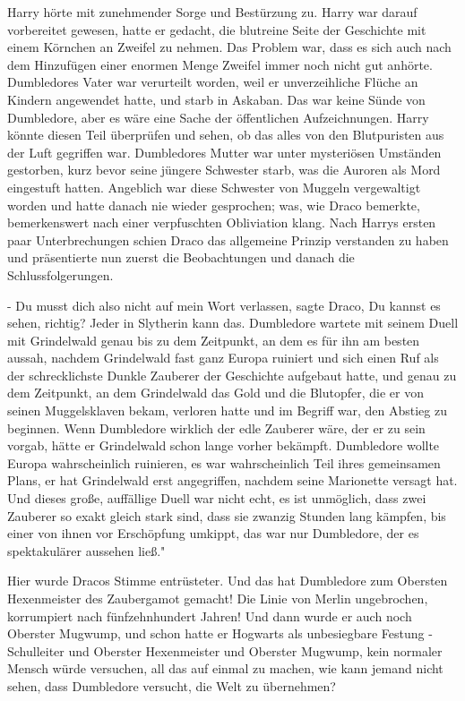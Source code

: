 Harry hörte mit zunehmender Sorge und Bestürzung zu. Harry war darauf
vorbereitet gewesen, hatte er gedacht, die blutreine Seite der Geschichte mit
einem Körnchen an Zweifel zu nehmen. Das Problem war, dass es sich auch nach dem
Hinzufügen einer enormen Menge Zweifel immer noch nicht gut anhörte. Dumbledores
Vater war verurteilt worden, weil er unverzeihliche Flüche an Kindern angewendet
hatte, und starb in Askaban. Das war keine Sünde von Dumbledore, aber es wäre
eine Sache der öffentlichen Aufzeichnungen. Harry könnte diesen Teil überprüfen
und sehen, ob das alles von den Blutpuristen aus der Luft gegriffen war.
Dumbledores Mutter war unter mysteriösen Umständen gestorben, kurz bevor seine
jüngere Schwester starb, was die Auroren als Mord eingestuft hatten. Angeblich
war diese Schwester von Muggeln vergewaltigt worden und hatte danach nie wieder
gesprochen; was, wie Draco bemerkte, bemerkenswert nach einer verpfuschten
Obliviation klang. Nach Harrys ersten paar Unterbrechungen schien Draco das
allgemeine Prinzip verstanden zu haben und präsentierte nun zuerst die
Beobachtungen und danach die Schlussfolgerungen.

\glqq{}- Du musst dich also nicht auf mein Wort verlassen\grqq{}, sagte Draco,
\glqq{}Du kannst es sehen, richtig? Jeder in Slytherin kann das. Dumbledore
wartete mit seinem Duell mit Grindelwald genau bis zu dem Zeitpunkt, an dem es
für ihn am besten aussah, nachdem Grindelwald fast ganz Europa ruiniert und sich
einen Ruf als der schrecklichste Dunkle Zauberer der Geschichte aufgebaut hatte,
und genau zu dem Zeitpunkt, an dem Grindelwald das Gold und die Blutopfer, die
er von seinen Muggelsklaven bekam, verloren hatte und im Begriff war, den
Abstieg zu beginnen. Wenn Dumbledore wirklich der edle Zauberer wäre, der er zu
sein vorgab, hätte er Grindelwald schon lange vorher bekämpft. Dumbledore wollte
Europa wahrscheinlich ruinieren, es war wahrscheinlich Teil ihres gemeinsamen
Plans, er hat Grindelwald erst angegriffen, nachdem seine Marionette versagt
hat. Und dieses große, auffällige Duell war nicht echt, es ist unmöglich, dass
zwei Zauberer so exakt gleich stark sind, dass sie zwanzig Stunden lang kämpfen,
bis einer von ihnen vor Erschöpfung umkippt, das war nur Dumbledore, der es
spektakulärer aussehen ließ."

Hier wurde Dracos Stimme entrüsteter. \glqq{}Und das hat Dumbledore zum Obersten
Hexenmeister des Zaubergamot gemacht! Die Linie von Merlin ungebrochen,
korrumpiert nach fünfzehnhundert Jahren! Und dann wurde er auch noch Oberster
Mugwump, und schon hatte er Hogwarts als unbesiegbare Festung - Schulleiter und
Oberster Hexenmeister und Oberster Mugwump, kein normaler Mensch würde
versuchen, all das auf einmal zu machen, wie kann jemand nicht sehen, dass
Dumbledore versucht, die Welt zu übernehmen?\grqq{}

